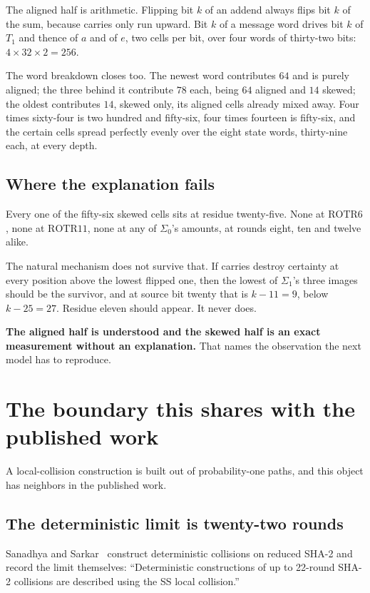 The aligned half is arithmetic. Flipping bit \(k\) of an addend always flips bit \(k\) of the sum,
because carries only run upward. Bit \(k\) of a message word drives bit \(k\) of \(T_1\) and
thence of \(a\) and of \(e\), two cells per bit, over four words of thirty-two bits:
\(4 \times 32 \times 2 = 256\).

The word breakdown closes too. The newest word contributes \(64\) and is purely aligned; the three
behind it contribute \(78\) each, being \(64\) aligned and \(14\) skewed; the oldest contributes
\(14\), skewed only, its aligned cells already mixed away. Four times sixty-four is two hundred and
fifty-six, four times fourteen is fifty-six, and the certain cells spread perfectly evenly over the
eight state words, thirty-nine each, at every depth.

\subsection{Where the explanation fails}

Every one of the fifty-six skewed cells sits at residue twenty-five. None at \(\mathrm{ROTR}6\),
none at \(\mathrm{ROTR}11\), none at any of \(\Sigma_0\)'s amounts, at rounds eight, ten and twelve
alike.

The natural mechanism does not survive that. If carries destroy certainty at every position above
the lowest flipped one, then the lowest of \(\Sigma_1\)'s three images should be the survivor, and
at source bit twenty that is \(k - 11 = 9\), below \(k - 25 = 27\). Residue eleven should appear.
It never does.

\textbf{The aligned half is understood and the skewed half is an exact measurement without an
explanation.} That names the observation the next model has to reproduce.

\section{The boundary this shares with the published work}

A local-collision construction is built out of probability-one paths, and this object has neighbors
in the published work.

\subsection{The deterministic limit is twenty-two rounds}

Sanadhya and Sarkar~\cite{src:Sanadhya-and-Sarkar-2008} construct deterministic collisions on
reduced SHA-2 and record the limit themselves: ``Deterministic constructions of up to 22-round SHA-2
collisions are described using the SS local collision.''

